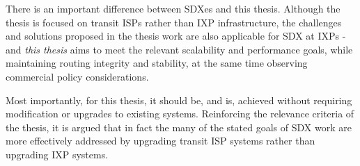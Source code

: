 
There is an important difference between SDXes and this thesis. Although the thesis is focused on transit ISPs rather than IXP infrastructure, the challenges and solutions proposed in the thesis work are also applicable for SDX at IXPs - and \emph{this thesis} aims to meet the relevant scalability and performance goals, while maintaining routing integrity and stability, at the same time observing commercial policy considerations.

Most importantly, for this thesis, it should be, and is,  achieved without requiring modification or upgrades to existing systems.
Reinforcing the relevance criteria of the thesis, it is argued that in fact the many of the stated goals of SDX work are more effectively addressed by upgrading transit ISP systems rather than upgrading IXP systems.







